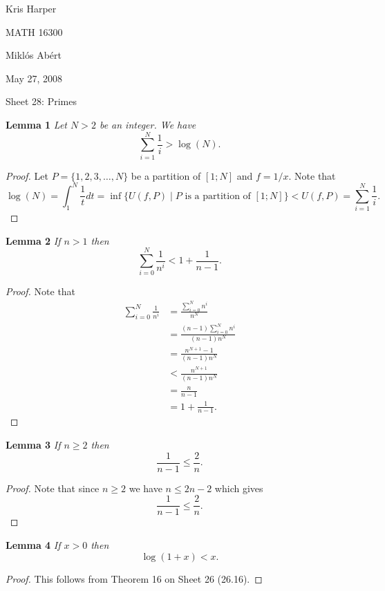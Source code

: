 \documentclass{article}
\begin{document}
\newpage

\begin{flushright}
Kris Harper

MATH 16300

Mikl\'{o}s Ab\'{e}rt

May 27, 2008
\end{flushright}

\begin{flushleft}

\Large

Sheet 28: Primes\newline

\normalsize

\textbf{Lemma 1}
\textsl{Let $N > 2$ be an integer. We have
\[
\sum_{i=1}^N \frac{1}{i} > \log (N).
\]}
\begin{proof}
Let $P = \{1, 2, 3, \dots , N\}$ be a partition of $[1;N]$ and $f = 1/x$. Note that
\[
\log (N) = \int_1^N \frac{1}{t} dt = \inf \{U(f, P) \mid \text{$P$ is a partition of $[1;N]$}\} < U(f,P) = \sum_{i=1}^N \frac{1}{i}.
\]
\end{proof}

\textbf{Lemma 2}
\textsl{If $n > 1$ then
\[
\sum_{i=0}^N \frac{1}{n^i} < 1 + \frac{1}{n-1}.
\]}
\begin{proof}
Note that
\begin{align*}
\sum_{i=0}^N \frac{1}{n^i} &= \frac{\sum_{i=0}^N n^i}{n^N} \\
					 &= \frac{(n-1) \sum_{i=0}^N n^i}{(n-1) n^N} \\
					 &= \frac{n^{N+1} - 1}{(n-1) n^N} \\
					 &< \frac{n^{N+1}}{(n-1) n^N} \\
					 &= \frac{n}{n-1} \\
					 &= 1 + \frac{1}{n-1}.
\end{align*}
\end{proof}

\textbf{Lemma 3}
\textsl{If $n \geq 2$ then
\[
\frac{1}{n-1} \leq \frac{2}{n}.
\]}
\begin{proof}
Note that since $n \geq 2$ we have $n \leq 2n - 2$ which gives
\[
\frac{1}{n-1} \leq \frac{2}{n}.
\]
\end{proof}

\textbf{Lemma 4}
\textsl{If $x > 0$ then
\[
\log (1+x) < x.
\]}
\begin{proof}
This follows from Theorem 16 on Sheet 26 (26.16).
\end{proof}


\end{flushleft}
\end{document}
